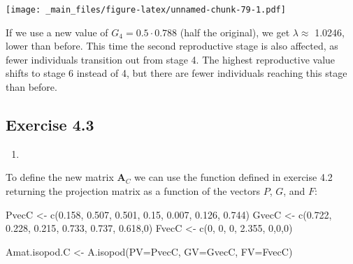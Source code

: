 \documentclass[
]{book}
\newenvironment{Shaded}{\begin{snugshade}}{\end{snugshade}}
\newcommand{\AttributeTok}[1]{\textcolor[rgb]{0.77,0.63,0.00}{#1}}
\newcommand{\DecValTok}[1]{\textcolor[rgb]{0.00,0.00,0.81}{#1}}
\newcommand{\FloatTok}[1]{\textcolor[rgb]{0.00,0.00,0.81}{#1}}
\newcommand{\FunctionTok}[1]{\textcolor[rgb]{0.00,0.00,0.00}{#1}}
\newcommand{\NormalTok}[1]{#1}
\newcommand{\OtherTok}[1]{\textcolor[rgb]{0.56,0.35,0.01}{#1}}
\providecommand{\tightlist}{%
  \setlength{\itemsep}{0pt}\setlength{\parskip}{0pt}}
\begin{document}
\texttt{[image: \_main\_files/figure-latex/unnamed-chunk-79-1.pdf]}

If we use a new value of \(G_4=0.5\cdot 0.788\) (half the original), we get \(\lambda\approx\) 1.0246, lower than before. This time the second reproductive stage is also affected, as fewer individuals transition out from stage 4. The highest reproductive value shifts to stage 6 instead of 4, but there are fewer individuals reaching this stage than before.

\hypertarget{exercise-4.3-1}{%
\subsection*{Exercise 4.3}\label{exercise-4.3-1}}

\begin{enumerate}
\def\labelenumi{\arabic{enumi}.}
\tightlist
\item
\end{enumerate}

To define the new matrix \(\mathbf{A}_C\) we can use the function defined in exercise 4.2 returning the projection matrix as a function of the vectors \(P\), \(G\), and \(F\):

\begin{Shaded}
\begin{Highlighting}[]
\NormalTok{PvecC }\OtherTok{\textless{}{-}} \FunctionTok{c}\NormalTok{(}\FloatTok{0.158}\NormalTok{, }\FloatTok{0.507}\NormalTok{, }\FloatTok{0.501}\NormalTok{, }\FloatTok{0.15}\NormalTok{, }\FloatTok{0.007}\NormalTok{, }\FloatTok{0.126}\NormalTok{, }\FloatTok{0.744}\NormalTok{)}
\NormalTok{GvecC }\OtherTok{\textless{}{-}} \FunctionTok{c}\NormalTok{(}\FloatTok{0.722}\NormalTok{, }\FloatTok{0.228}\NormalTok{, }\FloatTok{0.215}\NormalTok{, }\FloatTok{0.733}\NormalTok{, }\FloatTok{0.737}\NormalTok{, }\FloatTok{0.618}\NormalTok{,}\DecValTok{0}\NormalTok{)}
\NormalTok{FvecC }\OtherTok{\textless{}{-}} \FunctionTok{c}\NormalTok{(}\DecValTok{0}\NormalTok{, }\DecValTok{0}\NormalTok{, }\DecValTok{0}\NormalTok{, }\FloatTok{2.355}\NormalTok{, }\DecValTok{0}\NormalTok{,}\DecValTok{0}\NormalTok{,}\DecValTok{0}\NormalTok{)}
 
\NormalTok{Amat.isopod.C }\OtherTok{\textless{}{-}} \FunctionTok{A.isopod}\NormalTok{(}\AttributeTok{PV=}\NormalTok{PvecC, }\AttributeTok{GV=}\NormalTok{GvecC, }\AttributeTok{FV=}\NormalTok{FvecC)}
\end{Highlighting}
\end{Shaded}
\end{document}

